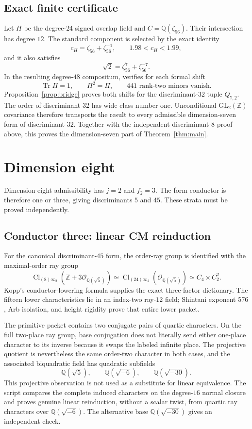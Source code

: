 \documentclass[11pt]{article}
\newcommand{\Cl}{\operatorname{Cl}}
\newcommand{\Tr}{\operatorname{Tr}}
\newcommand{\Q}{\mathbb Q}
\newcommand{\Z}{\mathbb Z}
\begin{document}
\subsection{Exact finite certificate}

Let $H$ be the degree-$24$ signed overlap field and
$C=\Q(\zeta_{56})$.  Their intersection has degree $12$.  The standard
component is selected by the exact identity
\[
 c_H=\zeta_{56}+\zeta_{56}^{-1},\qquad
 1.98<c_H<1.99,
\tag{16}
\]
and it also satisfies
\[
 \sqrt2=\zeta_{56}^{7}+\zeta_{56}^{-7}.
\tag{17}
\]
In the resulting degree-$48$ compositum,
 verifies for each formal
shift
\[
 \Tr\Pi=1,\qquad \Pi^2=\Pi,\qquad
 441\text{ rank-two minors vanish}.
\tag{18}
\]
Proposition~\ref{prop:bridge} proves both shifts for the
discriminant-$32$ tuple $Q_{7,2}$. The order of discriminant $32$ has
wide class number one. Unconditional $\mathrm{GL}_2(\Z)$ covariance
therefore transports the result to every admissible dimension-seven
form of discriminant $32$. Together with the independent
discriminant-$8$ proof above, this proves the dimension-seven part of
Theorem~\ref{thm:main}.

\section{Dimension eight}\label{sec:d8}

Dimension-eight admissibility has $j=2$ and $f_2=3$.  The form
conductor is therefore one or three, giving discriminants $5$ and
$45$.  These strata must be proved independently.

\subsection{Conductor three: linear CM reinduction}

For the canonical discriminant-$45$ form, the order-ray group is
identified with the maximal-order ray group
\[
 \Cl_{(8)\infty_2}(\Z+3\mathcal O_{\Q(\sqrt5)})
 \simeq
 \Cl_{(24)\infty_2}(\mathcal O_{\Q(\sqrt5)})
 \simeq C_4\times C_2^2.
\tag{19}
\]
Kopp's conductor-lowering formula supplies the exact three-factor
dictionary.  The fifteen lower characteristics lie in an index-two
ray-$12$ field; Shintani exponent $576$, Arb isolation, and height
rigidity prove that entire lower packet.

The primitive packet contains two conjugate pairs of quartic
characters.  On the full two-place ray group, base conjugation does
not literally send either one-place character to its inverse because
it swaps the labeled infinite place.  The projective quotient is
nevertheless the same order-two character in both cases, and the
associated biquadratic field has quadratic subfields
\[
 \Q(\sqrt5),\qquad\Q(\sqrt{-6}),\qquad\Q(\sqrt{-30}).
\tag{20}
\]
This projective observation is not used as a substitute for linear
equivalence.  The script
 compares the
complete induced characters on the degree-$16$ normal closure and
proves genuine linear reinduction, without a scalar twist, from
quartic ray characters over $\Q(\sqrt{-6})$.  The alternative base
$\Q(\sqrt{-30})$ gives an independent check.
\end{document}
